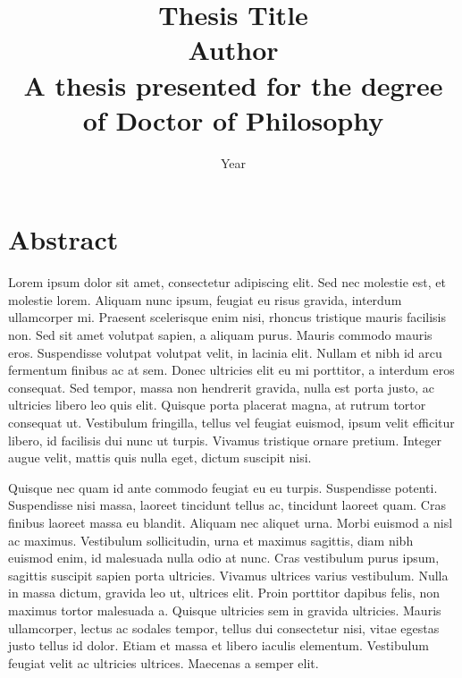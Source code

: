 
\title{ \huge{\textbf{Thesis Title}} \\[1.2cm]
\vspace{2.2cm}
\Large{\textbf{Author}} \\[1.2cm]
\vspace{2cm}
\large{A thesis presented for the degree of Doctor of Philosophy} \\
\vspace{2.5cm}
}

\date{Year}

\maketitle

\cleardoublepage

\chapter*{Abstract}
Lorem ipsum dolor sit amet, consectetur adipiscing elit. Sed nec molestie est, et molestie lorem. Aliquam nunc ipsum, feugiat eu risus gravida, interdum ullamcorper mi. Praesent scelerisque enim nisi, rhoncus tristique mauris facilisis non. Sed sit amet volutpat sapien, a aliquam purus. Mauris commodo mauris eros. Suspendisse volutpat volutpat velit, in lacinia elit. Nullam et nibh id arcu fermentum finibus ac at sem. Donec ultricies elit eu mi porttitor, a interdum eros consequat. Sed tempor, massa non hendrerit gravida, nulla est porta justo, ac ultricies libero leo quis elit. Quisque porta placerat magna, at rutrum tortor consequat ut. Vestibulum fringilla, tellus vel feugiat euismod, ipsum velit efficitur libero, id facilisis dui nunc ut turpis. Vivamus tristique ornare pretium. Integer augue velit, mattis quis nulla eget, dictum suscipit nisi.

Quisque nec quam id ante commodo feugiat eu eu turpis. Suspendisse potenti. Suspendisse nisi massa, laoreet tincidunt tellus ac, tincidunt laoreet quam. Cras finibus laoreet massa eu blandit. Aliquam nec aliquet urna. Morbi euismod a nisl ac maximus. Vestibulum sollicitudin, urna et maximus sagittis, diam nibh euismod enim, id malesuada nulla odio at nunc. Cras vestibulum purus ipsum, sagittis suscipit sapien porta ultricies. Vivamus ultrices varius vestibulum. Nulla in massa dictum, gravida leo ut, ultrices elit. Proin porttitor dapibus felis, non maximus tortor malesuada a. Quisque ultricies sem in gravida ultricies. Mauris ullamcorper, lectus ac sodales tempor, tellus dui consectetur nisi, vitae egestas justo tellus id dolor. Etiam et massa et libero iaculis elementum. Vestibulum feugiat velit ac ultricies ultrices. Maecenas a semper elit.

